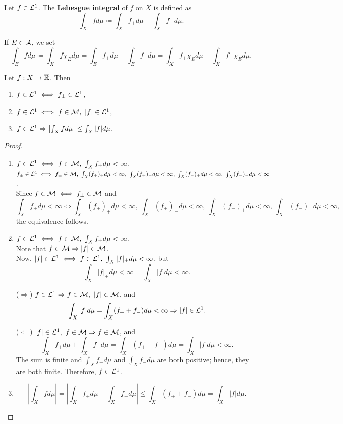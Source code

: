 \clearpage
\begin{definition}
Let $f \in \mathcal{L}^1$. The \textbf{Lebesgue integral} of $f$ on $X$ is defined as
\[
\int_X f  d\mu \coloneqq \int_X f_+  d\mu - \int_X f_-  d\mu.
\]

If $E \in \mathcal{A}$, we set
\[
\int_E f  d\mu \coloneqq \int_X f \chi_E  d\mu = \int_E f_+  d\mu - \int_E f_-  d\mu = \int_X f_+ \chi_E  d\mu - \int_X f_- \chi_E  d\mu.
\]
\end{definition}

\begin{proposition}
Let $f : X \to \overline{\mathbb{R}}$. Then
\begin{enumerate}
    \item $f \in \mathcal{L}^1 \iff f_\pm \in \mathcal{L}^1$,
    \item $f \in \mathcal{L}^1 \iff f \in \mathcal{M},\ |f| \in \mathcal{L}^1$,
    \item $f \in \mathcal{L}^1 \Rightarrow \left| \int_X f  d\mu \right| \leq \int_X |f|  d\mu$.
\end{enumerate}
\end{proposition}

\begin{proof}
\begin{enumerate}
    \item 
    $f \in \mathcal{L}^1 \iff f \in \mathcal{M},\ \int_X f_\pm  d\mu < \infty$. \\
    $f_\pm \in \mathcal{L}^1 \iff f_\pm \in \mathcal{M},\ \int_X (f_+)_+  d\mu < \infty,\ \int_X (f_+)_-  d\mu < \infty,\ \int_X (f_-)_+  d\mu < \infty,\ \int_X (f_-)_-  d\mu < \infty$. \\
    Since $f \in \mathcal{M} \iff f_\pm \in \mathcal{M}$ and
    \[
    \int_X f_\pm  d\mu < \infty \iff \int_X (f_+)_+  d\mu < \infty,\ \int_X (f_+)_-  d\mu < \infty,\ \int_X (f_-)_+  d\mu < \infty,\ \int_X (f_-)_-  d\mu < \infty,
    \]
    the equivalence follows.

    \item 
    $f \in \mathcal{L}^1 \iff f \in \mathcal{M},\ \int_X f_\pm  d\mu < \infty$. \\
    Note that $f \in \mathcal{M} \Rightarrow |f| \in \mathcal{M}$. \\
    Now, $|f| \in \mathcal{L}^1 \iff f \in \mathcal{L}^1,\ \int_X |f|_\pm  d\mu < \infty$, but
    \[
    \int_X |f|_\pm  d\mu < \infty = \int_X |f|  d\mu < \infty.
    \]

    ($\Rightarrow$) 
    $f \in \mathcal{L}^1 \Rightarrow f \in \mathcal{M},\ |f| \in \mathcal{M}$, and
    \[
    \int_X |f|  d\mu = \int_X (f_+ + f_-)  d\mu < \infty \Rightarrow |f| \in \mathcal{L}^1.
    \]

    ($\Leftarrow$) 
    $|f| \in \mathcal{L}^1,\ f \in \mathcal{M} \Rightarrow f \in \mathcal{M}$, and
    \[
    \int_X f_+  d\mu + \int_X f_-  d\mu = \int_X (f_+ + f_-)  d\mu = \int_X |f|  d\mu < \infty.
    \]
    The sum is finite and $\int_X f_+  d\mu$ and $\int_X f_-  d\mu$ are both positive; hence, they are both finite. Therefore, $f \in \mathcal{L}^1$.

    \item
    $$
    \left| \int_X f  d\mu \right| = \left| \int_X f_+  d\mu - \int_X f_-  d\mu \right| \leq \int_X (f_+ + f_-)  d\mu = \int_X |f|  d\mu.
    $$
\end{enumerate}
\end{proof}

